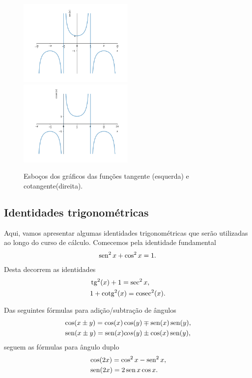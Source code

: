 \begin{figure}[H]
  \centering
  \includegraphics[width=0.5\textwidth]{./cap_funcao/dados/fig_co_sec_graficos/fig_sec_grafico}~
  \includegraphics[width=0.5\textwidth]{./cap_funcao/dados/fig_co_sec_graficos/fig_cosec_grafico}
  \caption{Esboços dos gráficos das funções tangente (esquerda) e cotangente(direita).}
  \label{fig:co_sec_graficos}
\end{figure}

\subsection{Identidades trigonométricas}

Aqui, vamos apresentar algumas identidades trigonométricas que serão utilizadas ao longo do curso de cálculo. Comecemos pela identidade fundamental
\begin{equation}
  \operatorname{sen}^2 x + \cos^2 x = 1.
\end{equation}
Desta decorrem as identidades
\begin{align}
  &\operatorname{tg}^2(x) + 1 = \sec^2 x,\\
  &1 + \operatorname{cotg}^2(x) = \operatorname{cosec}^2(x).
\end{align}

Das seguintes fórmulas para adição/subtração de ângulos
\begin{align}
  &\cos(x\pm y) = \cos(x)\cos(y) \mp \operatorname{sen}(x)\operatorname{sen}(y),\\
  &\operatorname{sen}(x\pm y) = \operatorname{sen}(x)cos(y) \pm \cos(x)\operatorname{sen}(y),
\end{align}
seguem as fórmulas para ângulo duplo
\begin{align}
  &\cos(2x) = \cos^2x - \operatorname{sen}^2x,\\
  &\operatorname{sen}(2x) = 2\operatorname{sen} x\cos x.
\end{align}

